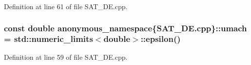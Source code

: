 Definition at line 61 of file S\-A\-T\-\_\-\-D\-E.\-cpp.

\hypertarget{namespaceanonymous__namespace_02SAT__DE_8cpp_03_af9ba43b60b8cf661784a1b5c2410045d}{
\subsubsection[{umach}]{\setlength{\rightskip}{0pt plus 5cm}const double anonymous\-\_\-namespace\{S\-A\-T\-\_\-\-D\-E.\-cpp\}\-::umach = std\-::numeric\-\_\-limits$<$double$>$\-::epsilon()}}\label{namespaceanonymous__namespace_02SAT__DE_8cpp_03_af9ba43b60b8cf661784a1b5c2410045d}


Definition at line 59 of file S\-A\-T\-\_\-\-D\-E.\-cpp.

